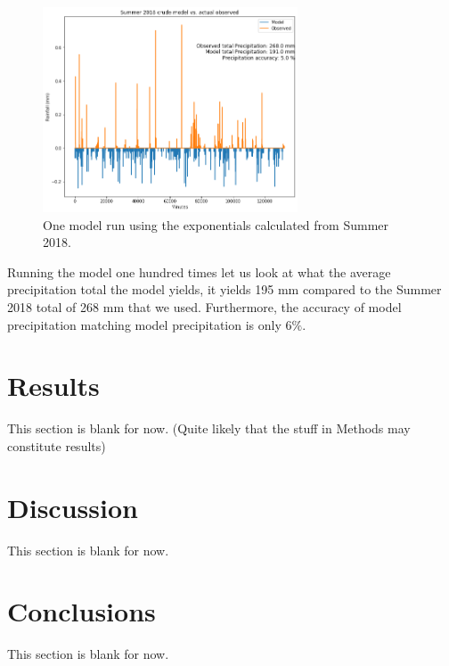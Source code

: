 \documentclass[11pt]{report}
\begin{document}
\begin{figure}[b]
	\centering
	\includegraphics[width=0.675\textwidth]{Figures/better_one_run.png}
	\caption[One run using Summer 2018 climatology]
	{\label{crudemodel}One model run using the exponentials calculated from Summer 2018.  }
\end{figure}
Running the model one hundred times let us look at what the average precipitation total the model yields, it yields 195 mm compared to the Summer 2018 total of 268 mm that we used. Furthermore, the accuracy of model precipitation matching model precipitation is only 6$\%$. 
\section{Results\label{sec:results}}

This section is blank for now. (Quite likely that the stuff in Methods
may constitute results)

\section{Discussion\label{sec:discussion}}
This section is blank for now. 

\section{Conclusions\label{sec:conclusions}}
This section is blank for now. 

\small
\renewcommand{\bibsep}{0em}

\renewcommand{\bibname}{References}


\end{document}
